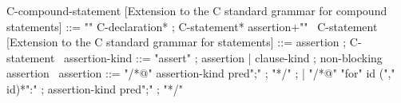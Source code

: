 \begin{syntax}
  C-compound-statement [Extension to the C  standard grammar for compound statements] ::=
    "{" C-declaration* ;
    C-statement* assertion+"}"
  \
  C-statement  [Extension to the C  standard grammar for statements] ::=
  assertion ;
  C-statement
  \
  assertion-kind ::= "assert" ; assertion
  | clause-kind ; non-blocking assertion
  \
  assertion ::= "/*@" assertion-kind pred";" ;
    "*/" ;
  | "/*@" "for" id ("," id)*":" ;
    assertion-kind pred";" ;
    "*/"
\end{syntax}
